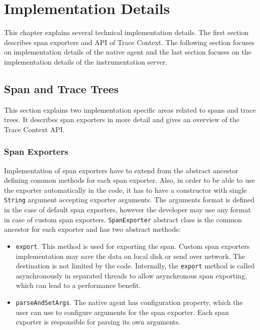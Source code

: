 \chapter{Implementation Details}
\label{chap:implementation}
This chapter explains several technical implementation details. The first section describes span exporters and API of Trace Context. The following section focuses on implementation details of the native agent and the last section focuses on the implementation details of the instrumentation server.

\section{Span and Trace Trees}
This section explains two implementation specific areas related to spans and trace trees. It describes span exporters in more detail and gives an overview of the Trace Context API. 
\subsection{Span Exporters}
\label{imp:exporter}
Implementation of span exporters have to extend from the abstract ancestor defining common methods for each span exporter. Also, in order to be able to use the exporter automatically in the code, it has to have a constructor with single \texttt{String} argument accepting exporter arguments. The arguments format is defined in the case of default span exporters, however the developer may use any format in case of custom span exporters. \texttt{SpanExporter} abstract class is the common ancestor for each exporter and has two abstract methods:
\begin{itemize}
	\item \texttt{export}. This method is used for exporting the span. Custom span exporters implementation may save the data on local disk or send over network. The destination is not limited by the code. Internally, the \texttt{export} method is called asynchronously in separated threads to allow asynchronous span exporting, which can lead to a performance benefit.
	\item \texttt{parseAndSetArgs}. The native agent has configuration property, which the user can use to configure arguments for the span exporter. Each span exporter is responsible for parsing its own arguments.
\end{itemize}

